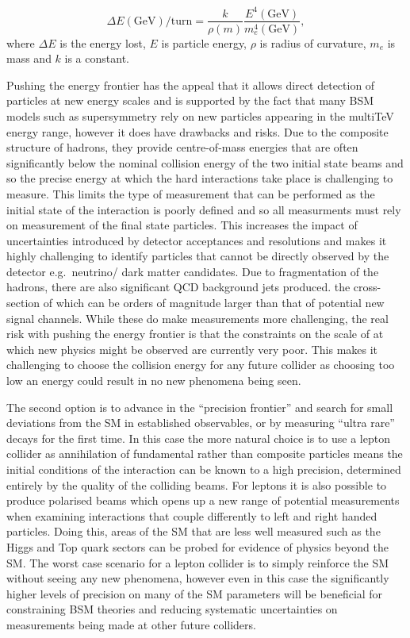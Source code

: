\begin{equation}
\label{Eq:synchotron radiation}
\Delta E(\text{GeV})/\text{turn} = \frac{k}{\rho(m)}\frac{E^4(\text{GeV})}{m^4_e(\text{GeV})},
\end{equation}
where $\Delta E$ is the energy lost, $E$ is particle energy, $\rho$ is radius of curvature, $m_e$ is mass and $k$ is a constant.

Pushing the energy frontier has the appeal that it allows direct detection of particles at new energy scales and is supported by the fact that many \ac{BSM} models such as supersymmetry\cite{Baer:2012cf} rely on new particles appearing in the multiTeV energy range, however it does have drawbacks and risks. Due to the composite structure of hadrons, they provide centre-of-mass energies that are often significantly below the nominal collision energy of the two initial state beams and so the precise energy at which the hard interactions take place is challenging to measure. This limits the type of measurement that can be performed as the initial state of the interaction is poorly defined and so all measurments must rely on measurement of the final state particles. This increases the impact of uncertainties introduced by detector acceptances and resolutions and makes it highly challenging to identify particles that cannot be directly observed by the detector e.g.\ neutrino/ dark matter candidates. Due to fragmentation of the hadrons, there are also significant \ac{QCD} background jets produced. the cross-section of which can be orders of magnitude larger than that of potential new signal channels. While these do make measurements more challenging, the real risk with pushing the energy frontier is that the constraints on the scale of at which new physics might be observed are currently very poor\cite{Dawson:2013bba}. This makes it challenging to choose the collision energy for any future collider as choosing too low an energy could result in no new phenomena being seen.

The second option is to advance in the ``precision frontier'' and search for small deviations from the \ac{SM} in established observables, or by measuring ``ultra rare'' decays for the first time\cite{Fujii:2015jha}. In this case the more natural choice is to use a lepton collider as annihilation of fundamental rather than composite particles means the initial conditions of the interaction can be known to a high precision, determined entirely by the quality of the colliding beams. For leptons it is also possible to produce polarised beams which opens up a new range of potential measurements when examining interactions that couple differently to left and right handed particles. Doing this, areas of the \ac{SM} that are less well measured such as the Higgs and Top quark sectors can be probed for evidence of physics beyond the \ac{SM}. The worst case scenario for a lepton collider is to simply reinforce the \ac{SM} without seeing any new phenomena, however even in this case the significantly higher levels of precision on many of the \ac{SM} parameters will be beneficial for constraining \ac{BSM} theories and reducing systematic uncertainties on measurements being made at other future colliders.


